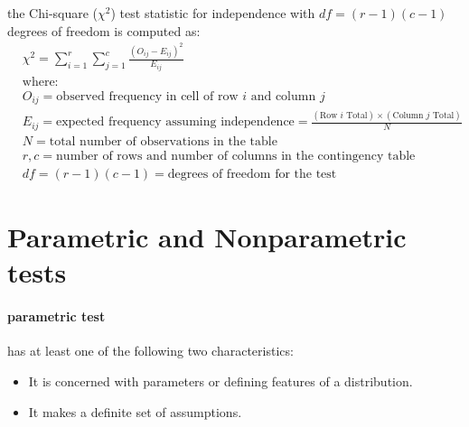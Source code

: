 the Chi-square ($\chi^2$) test statistic for independence with $df = (r - 1)(c - 1)$ degrees of freedom is computed as:
\begin{align*}
	 & \chi^2 = \sum_{i=1}^{r}\sum_{j=1}^{c}\frac{(O_{ij}-E_{ij})^2}{E_{ij}}                                             \\
	 & \text{where:}                                                                                                      \\
	 & O_{ij} = \text{observed frequency in cell of row } i \text{ and column } j                                        \\
	 & E_{ij} = \text{expected frequency assuming independence} = \frac{(\text{Row } i \text{ Total}) \times (\text{Column } j \text{ Total})}{N} \\
	 & N = \text{total number of observations in the table}                                                               \\
	 & r, c = \text{number of rows and number of columns in the contingency table}                                       \\
	 & df = (r-1)(c-1) = \text{degrees of freedom for the test}
\end{align*}
\section{Parametric and Nonparametric tests}
\label{sec:Parametric and Nonparametric tests}
\paragraph{parametric test} %
\label{par:parametric test}
has at least one of the following two characteristics:
\begin{itemize}
	\item[-] It is concerned with parameters or defining features of a distribution.
	\item[-] It makes a definite set of assumptions.
\end{itemize}
